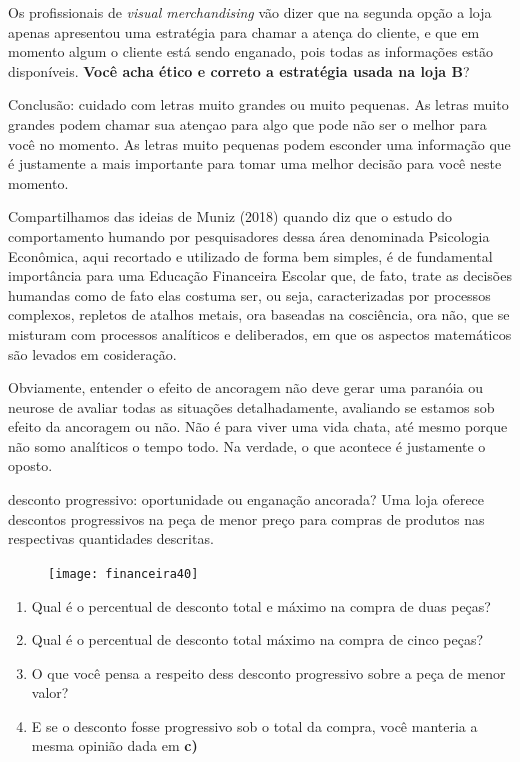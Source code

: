 Os profissionais de \textit{visual merchandising} vão dizer que na segunda opção a loja apenas apresentou uma estratégia para chamar a atença do cliente, e que em momento algum o cliente está sendo enganado, pois todas as informações estão disponíveis. \textbf{Você acha ético e correto a estratégia usada na loja B}?

Conclusão: cuidado com letras muito grandes ou muito pequenas. As letras muito grandes podem chamar sua atençao para algo que pode não ser o melhor para você no momento. As letras muito pequenas podem esconder uma informação que é justamente a mais importante para tomar uma melhor decisão para você neste momento.

Compartilhamos das ideias de Muniz (2018) quando diz que o estudo do comportamento humando por pesquisadores dessa área denominada Psicologia Econômica, aqui recortado e utilizado de forma bem simples, é  de fundamental importância para uma Educação Financeira Escolar que, de fato, trate as decisões humandas como de fato elas costuma ser, ou seja, caracterizadas por processos complexos, repletos de atalhos metais, ora baseadas na cosciência, ora não, que se misturam com processos analíticos e deliberados, em que os aspectos matemáticos são levados em cosideração.

Obviamente, entender o efeito de ancoragem não deve gerar uma paranóia ou neurose de avaliar todas as situações detalhadamente, avaliando se estamos sob efeito da ancoragem ou não. Não é para viver uma vida chata, até mesmo porque não somo analíticos o tempo todo. Na verdade, o que acontece é justamente o oposto.


\begin{task}{desconto progressivo: oportunidade ou enganação ancorada?}
Uma loja oferece descontos progressivos na peça de menor preço para compras de produtos nas respectivas quantidades descritas.

\begin{figure}[H]
\centering

\texttt{[image: financeira40]}
\end{figure}

\begin{enumerate}
\item Qual é o percentual de desconto total e máximo na compra de duas peças?
\item Qual é o percentual de desconto total máximo na compra de cinco peças?
\item O que você pensa a respeito dess desconto progressivo sobre a peça de menor valor?
\item E se o desconto fosse progressivo sob o total da compra, você manteria a mesma opinião dada em \textcolor{\currentcolor}{\textbf{c)}}
\end{enumerate}
\end{task}

